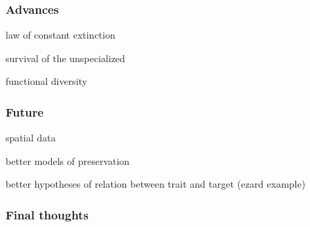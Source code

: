 \documentclass{beamer}
\begin{document}
\begin{frame}
  \frametitle{Advances}

  law of constant extinction

  survival of the unspecialized

  functional diversity
\end{frame}

\begin{frame}
  \frametitle{Future}

  spatial data

  better models of preservation

  better hypotheses of relation between trait and target (ezard example)
\end{frame}

\begin{frame}
  \frametitle{Final thoughts}
\end{frame}





\appendix
%
%
%
\end{document}
